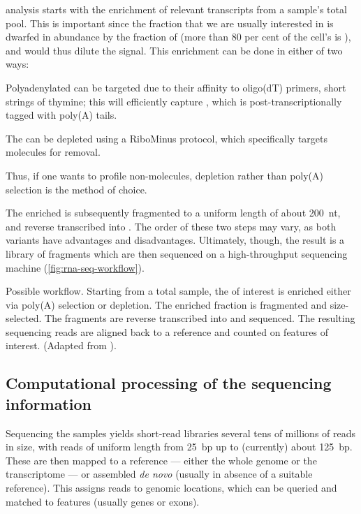 \rnaseq analysis starts with the enrichment of relevant transcripts from a
sample’s total \rna pool. This is important since the \rna fraction that we are
usually interested in is dwarfed in abundance by the fraction of \rrna (more
than \num{80} per cent of the cell’s \rna is \rrna), and would thus dilute the
signal. This enrichment can be done in either of two ways:
\begin{enumerate*}
    \item Polyadenylated \rna can be targeted due to their affinity to oligo(dT)
        primers, short strings of thymine; this will efficiently capture \mrna,
        which is post-transcriptionally \threep tagged with poly(A) tails.
    \item The \rna can be \rrna depleted using a RiboMinus protocol, which
        specifically targets \rrna molecules for removal.
\end{enumerate*}
Thus, if one wants to profile non-\mrna molecules, \rrna depletion rather than
poly(A) selection is the method of choice.

The enriched \rna is subsequently fragmented to a uniform length of about
\SI{200}{nt}, and reverse transcribed into \cdna. The order of these two steps
may vary, as both variants have advantages and disadvantages. Ultimately,
though, the result is a \cdna library of fragments which are then sequenced on a
high-throughput sequencing machine (\cref{fig:rna-seq-workflow}).

    {Possible \rnaseq workflow.}
    {Starting from a total \rna sample, the \rna of interest is enriched either
    via poly(A) selection or \rrna depletion. The enriched fraction is
    fragmented and size-selected. The fragments are reverse transcribed into
    \cdna and sequenced. The resulting sequencing reads are aligned back to a
    reference and counted on features of interest. (Adapted from
    \citet{Mortazavi:2008}).}

\subsection{Computational processing of the sequencing information}

Sequencing the \rnaseq samples yields short-read libraries several tens of
millions of reads in size, with reads of uniform length from \SI{25}{bp} up to
(currently) about \SI{125}{bp}. These are then mapped to a reference --- either
the whole genome or the transcriptome --- or assembled \emph{de novo} (usually
in absence of a suitable reference). This assigns reads to genomic locations,
which can be queried and matched to features (usually genes or exons).

